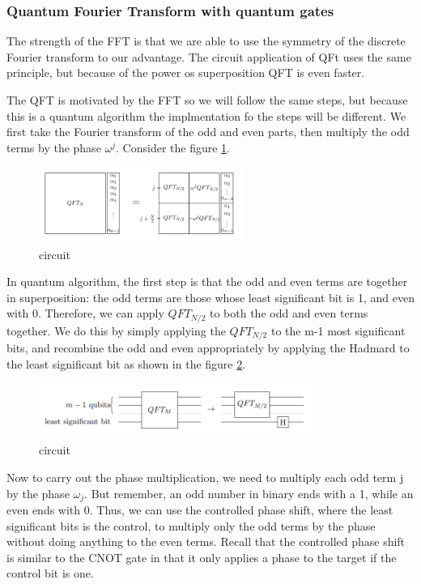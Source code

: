 \documentclass[12pt, oneside]{book}
\theoremstyle{definition}
\theoremstyle{definition}
\theoremstyle{remark}
\begin{document}
\subsubsection{Quantum Fourier Transform with quantum gates}
The strength of the FFT is that we are able to use the symmetry of the discrete Fourier transform to our advantage.
The circuit application of QFt uses the same principle, but because of the power os superposition QFT is even faster.

The QFT is motivated by the FFT so we will follow the same steps, but because this is a quantum algorithm the implmentation fo the steps will be different. 
We first take the Fourier transform of the odd and even parts, then multiply the odd terms by the phase $\omega^j$.
Consider the figure \ref{fig:qtf_final}.
\begin{figure}[H]
    \centering
    \includegraphics[width=0.6\textwidth]{../images/qft_final.png}
    \caption{circuit}
    \label{fig:qtf_final}
\end{figure}
In quantum algorithm, the first step is that the odd and even terms are together in superposition: the odd terms are those 
whose least significant bit is 1, and even with 0. Therefore, we can apply $QFT_{N/2}$ to both the odd and even terms together.
We do this by simply applying the $QFT_{N/2}$ to the m-1 most significant bits, and recombine the odd and even appropriately by 
applying the Hadmard to the least significant bit as shown in the figure \ref{fig:qft_1}.
\begin{figure}[H]
    \centering
    \includegraphics[width=0.8\textwidth]{../images/qft_1.png}
    \caption{circuit}
    \label{fig:qft_1}
\end{figure}

Now to carry out the phase multiplication, we need to multiply each odd term j by the phase $\omega_j$. But remember, an odd number in binary ends with a 1, while an even ends with 0.
Thus, we can use the controlled phase shift, where the least significant bits is the control, to multiply only the odd terms by the phase without doing anything to the even terms. 
Recall that the controlled phase shift is similar to the CNOT gate in that it only applies a phase to the target if the control bit is one.
\end{document}

